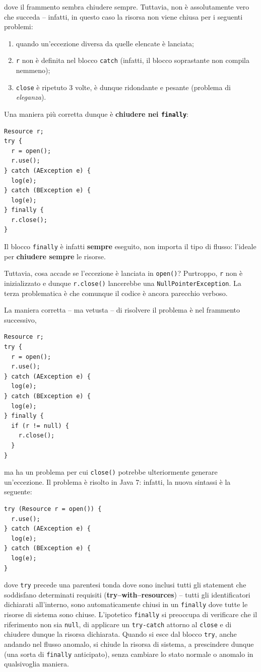\documentclass[\fontsizeclass,twocolumn]{\classname}
\theoremstyle{definition}
\theoremstyle{definition}
\begin{document}
dove il frammento sembra chiudere sempre. Tuttavia, non è assolutamente vero che succeda -- infatti, in questo caso la risorsa non viene chiusa per i seguenti problemi:
\begin{enumerate}
    \item quando un'eccezione diversa da quelle elencate è lanciata;
    \item \texttt{r} non è definita nel blocco \texttt{catch} (infatti, il
        blocco soprastante non compila nemmeno);
    \item \texttt{close} è ripetuto 3 volte, è dunque ridondante e pesante
        (problema di \emph{eleganza}).
\end{enumerate}

Una maniera più corretta dunque è \textbf{chiudere nei \texttt{finally}}:

\begin{lstlisting}
Resource r;
try {
  r = open();
  r.use();
} catch (AException e) {
  log(e);
} catch (BException e) {
  log(e);
} finally {
  r.close();
}
\end{lstlisting}

Il blocco \texttt{finally} è infatti \textbf{sempre} eseguito, non importa il
tipo di flusso: l'ideale per \textbf{chiudere sempre} le risorse.

Tuttavia, cosa accade se l'eccezione è lanciata in \texttt{open()}? Purtroppo,
\texttt{r} non è inizializzato e dunque \texttt{r.close()} lancerebbe una
\texttt{NullPointer\-Exception}. La terza problematica è che comunque il codice è
ancora parecchio verboso.

La maniera corretta -- ma vetusta -- di risolvere il problema è nel frammento
successivo,

\begin{lstlisting}
Resource r;
try {
  r = open();
  r.use();  
} catch (AException e) {
  log(e);
} catch (BException e) {
  log(e);
} finally {
  if (r != null) {
    r.close();
  }
}
\end{lstlisting}

ma ha un problema per cui \texttt{close()} potrebbe ulteriormente generare
un'eccezione. Il problema è risolto in Java 7: infatti, la nuova sintassi è la
seguente:

\begin{lstlisting}
try (Resource r = open()) {
  r.use();  
} catch (AException e) {
  log(e);
} catch (BException e) {
  log(e);
}
\end{lstlisting}

dove \texttt{try} precede una parentesi tonda dove sono inclusi tutti gli
statement che soddisfano determinati requisiti (\textbf{try--with--resources})
-- tutti gli identificatori dichiarati all'interno, sono automaticamente chiusi
in un \texttt{finally} dove tutte le risorse di sistema sono chiuse.
L'ipotetico \texttt{finally} si preoccupa di verificare che il riferimento non
sia \texttt{null}, di applicare un \texttt{try\--catch} attorno al \texttt{close}
e di chiudere dunque la risorsa dichiarata. Quando si esce dal blocco
\texttt{try}, anche andando nel flusso anomalo, si chiude la risorsa di
sistema, a prescindere dunque (una sorta di \texttt{finally} anticipato), senza
cambiare lo stato normale o anomalo in qualsivoglia maniera.
\end{document}

